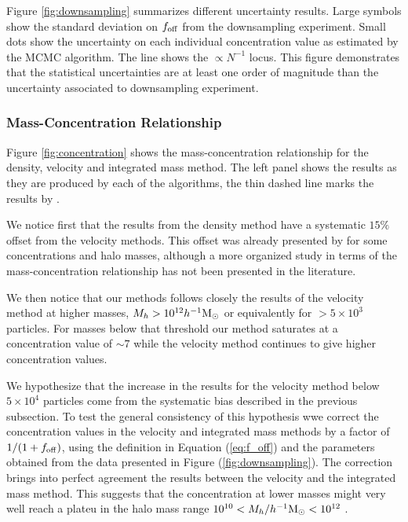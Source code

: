\documentclass[a4,useAMS,usenatbib,usegraphicx]{mn2e}
\newcommand{\hMsun}{{\ifmmode{h^{-1}{\rm {M_{\odot}}}}\else{$h^{-1}{\rm{M_{\odot}}}$}\fi}}
\begin{document}
Figure \ref{fig:downsampling} summarizes different uncertainty
results. 
Large symbols show the standard deviation on $f_{\rm off}$
from the downsampling experiment.
Small dots show the uncertainty on each individual concentration value
as estimated by the MCMC algorithm.
The line shows the $\propto N^{-1}$  locus.
This figure demonstrates that the statistical uncertainties are at
least one order of magnitude than the uncertainty associated to
downsampling experiment.


\subsubsection{Mass-Concentration Relationship}


Figure \ref{fig:concentration} shows the  mass-concentration
relationship for the density, velocity and integrated mass method.  
The left panel shows the results as they are produced by each of the
algorithms, the thin dashed line marks the results by \citep{Prada2012}.

We notice first that the results from the density method have a
systematic $15\%$offset from the velocity methods.
This offset was already presented by \citep{Prada2012} for some
concentrations and halo masses, although a more organized study in
terms of the mass-concentration relationship has not been presented in
the literature.

We then notice that our methods follows closely the results of the
velocity method at higher masses, $M_h>10^{12}\hMsun$ or equivalently
for $>5\times10^3$ particles. 
For masses below that threshold our method saturates at a
concentration value of $\sim 7$ while the velocity method continues to
give higher concentration values. 

We hypothesize that the increase in the results for the velocity
method below $5\times 10^{4}$ particles come from the systematic
bias described in the previous subsection.  
To test the general consistency of this hypothesis wwe correct the
concentration values in the velocity and integrated mass methods by
a factor of $1/(1+f_{\rm off})$, using the definition in Equation
(\ref{eq:f_off}) and the parameters obtained from the data presented
in Figure (\ref{fig:downsampling}).   
The correction brings into perfect agreement the results between the
velocity and the integrated mass method. 
This suggests that the concentration at lower masses might very well
reach a plateu in the halo mass range $10^{10}< M_{h}/\hMsun < 10^{12}$ .
\end{document}
